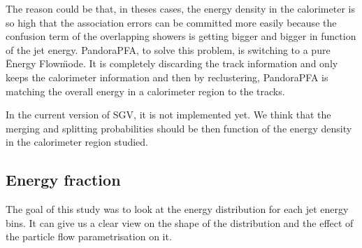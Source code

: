 The reason could be that, in theses cases, the energy density in the calorimeter is so high that the association errors can be committed more easily because the confusion term of the overlapping showers is getting bigger and bigger in function of the jet energy. PandoraPFA, to solve this problem, is switching to a pure \"Energy Flow\" mode. It is completely discarding the track information and only keeps the calorimeter information and then by reclustering, PandoraPFA is matching the overall energy in a calorimeter region to the tracks.


In the current version of SGV, it is not implemented yet. We think that the merging and splitting probabilities should be then function of the energy density in the calorimeter region studied.

\subsection{Energy fraction}

The goal of this study was to look at the energy distribution for each jet energy bins. It can give us a clear view on the shape of the distribution and the effect of the particle flow parametrisation on it.

